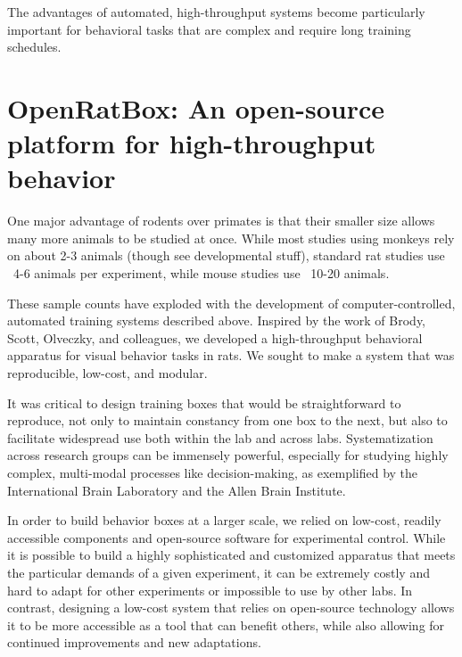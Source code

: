 The advantages of automated, high-throughput systems become particularly important for behavioral tasks that are complex and require long training schedules.  


\section{OpenRatBox: An open-source platform for high-throughput behavior}
One major advantage of rodents over primates is that their smaller size allows many more animals to be studied at once. While most studies using monkeys rely on about 2-3 animals (though see \cite{REFREF} developmental stuff), standard rat studies use ~4-6 animals per experiment\cite{REFREF}, while mouse studies use ~10-20 animals\cite{REFREF}. 

These sample counts have exploded with the development of computer-controlled, automated training systems described above. Inspired by the work of Brody, Scott, Olveczky, and colleagues, we developed a high-throughput behavioral apparatus for visual behavior tasks in rats. We sought to make a system that was reproducible, low-cost, and modular. 

It was critical to design training boxes that would be straightforward to reproduce, not only to maintain constancy from one box to the next, but also to facilitate widespread use both within the lab and across labs. Systematization across research groups can be immensely powerful, especially for studying highly complex, multi-modal processes like decision-making, as exemplified by the International Brain Laboratory\cite{IBL} and the Allen Brain Institute\cite{REFREF}.

In order to build behavior boxes at a larger scale, we relied on low-cost, readily accessible components and open-source software for experimental control. While it is possible to build a highly sophisticated and customized apparatus that meets the particular demands of a given experiment, it can be extremely costly and hard to adapt for other experiments or impossible to use by other labs. In contrast, designing a low-cost system that relies on open-source technology allows it to be more accessible as a tool that can benefit others, while also allowing for continued improvements and new adaptations. 

